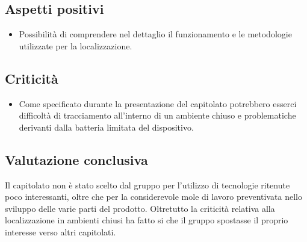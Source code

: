 \subsection{Aspetti positivi}
\begin{itemize}
	\item Possibilità di comprendere nel dettaglio il funzionamento e le metodologie utilizzate per la localizzazione.
\end{itemize}
\subsection{Criticità}
\begin{itemize}
	\item Come specificato durante la presentazione del capitolato potrebbero esserci difficoltà di tracciamento all'interno di un ambiente chiuso e problematiche derivanti dalla batteria limitata del dispositivo.
\end{itemize}
\subsection{Valutazione conclusiva}
Il capitolato non è stato scelto dal gruppo per l'utilizzo di tecnologie ritenute poco interessanti, oltre che per la considerevole mole di lavoro preventivata nello sviluppo delle varie parti del prodotto. Oltretutto la criticità relativa alla localizzazione in ambienti chiusi ha fatto si che il gruppo spostasse il proprio interesse verso altri capitolati.
